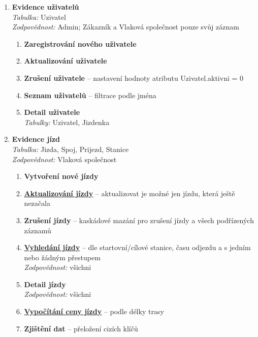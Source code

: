 \documentclass[11pt]{article}
\begin{document}
\begin{enumerate}
    \item \textbf{Evidence uživatelů}\\
        \textit{Tabulka:} Uzivatel\\
        \textit{Zodpovědnost:} Admin; Zákazník a Vlaková společnost pouze svůj záznam
        \begin{enumerate}
            \item \textbf{Zaregistrování nového uživatele}
            \item \textbf{Aktualizování uživatele}
            \item \textbf{Zrušení uživatele} – nastavení hodnoty atributu Uzivatel.aktivni = 0
            \item \textbf{Seznam uživatelů} – filtrace podle jména
            \item \textbf{Detail uživatele}\\
            \textit{Tabulky:} Uzivatel, Jizdenka
        \end{enumerate}

    \item \textbf{Evidence jízd}\\
        \textit{Tabulka:} Jizda, Spoj, Prijezd, Stanice\\
        \textit{Zodpovědnost:} Vlaková společnost
        \begin{enumerate}
            \item \textbf{Vytvoření nové jízdy}
            \item \underline{\textbf{Aktualizování jízdy}} – aktualizovat je možné jen jízdu, která ještě nezačala
            \item \textbf{Zrušení jízdy} – kaskádové mazání pro zrušení jízdy a všech podřízených záznamů
            \item \underline{\textbf{Vyhledání jízdy}} – dle startovní/cílové stanice, času odjezdu a s jedním nebo žádným přestupem\\
            \textit{Zodpovědnost:} všichni
            \item \textbf{Detail jízdy}\\
            \textit{Zodpovědnost:} všichni
            \item \underline{\textbf{Vypočítání ceny jízdy}} – podle délky trasy
            \item \textbf{Zjištění dat} -- přeložení cizích klíčů
        \end{enumerate}


\end{enumerate}
\end{document}
